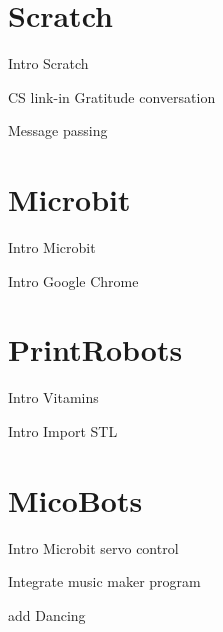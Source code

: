 \documentclass{article}
\def\FithGradeFour{Scratch}
\def\FithGradeFive{Microbit}
\def\FithGradeSix{PrintRobots}
\def\FithGradeSeven{MicoBots}
\begin{document}
	\section{\FithGradeFour}
	\begin{todolist}
		\item Intro Scratch
		\item CS link-in Gratitude conversation
		\item Message passing
	\end{todolist}

\section{\FithGradeFive}
\begin{todolist}
	\item Intro Microbit
	\item Intro Google Chrome
\end{todolist}
\section{\FithGradeSix}
\begin{todolist}
	\item Intro Vitamins
	\item Intro Import STL
\end{todolist}
\section{\FithGradeSeven}
\begin{todolist}
	\item Intro Microbit servo control
	\item Integrate music maker program
	\item add Dancing
\end{todolist}

\newpage
\end{document}
